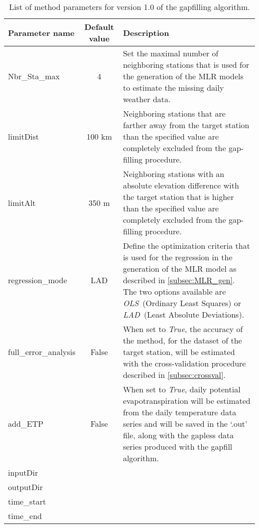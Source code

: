 \documentclass[ARTICLETHERMIC.tex]{subfiles}
\begin{document}
\begin{table}[!h]
    \centering
    \caption{List of method parameters for version 1.0 of the gapfilling algorithm.}
    \begin{tabular}{lcp{10.5cm}}
        \toprule
        Parameter name & Default value & Description\\
        \midrule
        Nbr\_Sta\_max & 4 & Set the maximal number of neighboring stations that is used for the generation of the MLR models to estimate the missing daily weather data.\\[1em]
        limitDist & 100 km & Neighboring stations that are farther away from the target station than the specified value are completely excluded from the gap-filling procedure. \\[1em]
        limitAlt & 350 m & Neighboring stations with an absolute elevation difference with the target station that is higher than the specified value are completely excluded from the gap-filling procedure.\\[1em]
        regression\_mode & LAD & Define the optimization criteria that is used for the regression in the generation of the MLR model as described in \cref{subsec:MLR_gen}. The two options available are \emph{OLS}~(Ordinary Least Squares) or \emph{LAD}~(Least Absolute Deviations). \\[1em]
        full\_error\_analysis & False & When set to \emph{True}, the accuracy of the method, for the dataset of the target station, will be estimated with the cross-validation procedure described in \cref{subsec:crossval}. \\[1em]
        add\_ETP & False & When set to \emph{True}, daily potential evapotranspiration will be estimated from the daily temperature data series and will be saved in the `.out' file, along with the gapless data series produced with the gapfill algorithm. \\[1em]
        inputDir \\
        outputDir \\
        time\_start\\
        time\_end\\
        \bottomrule
    \end{tabular}
    \label{tab:method_parameter}
\end{table}
\end{document}
